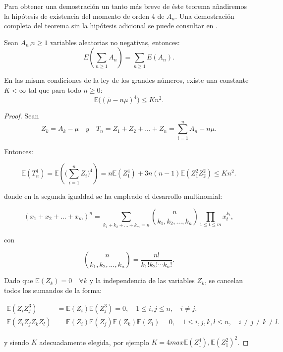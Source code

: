 \documentclass[../proyecto.tex]{memoir}
\begin{document}
Para obtener una demostración un tanto más breve de éste teorema añadiremos la hipótesis de existencia del momento de orden 4 de $A_n$. Una demostración completa del teorema sin la hipótesis adicional se puede consultar en \cite{elLibro}.

\begin{lema}  \label{intercambio_suma}
Sean $A_n$,$ n \geq 1$ variables aleatorias no negativas, entonces: $$
E \left( \sum_{n \geq 1} A_n \right) = \sum_{n \geq 1} E(A_n).
$$

\end{lema}

\begin{lema}
En las misma condiciones de la ley de los grandes números, existe una constante $ K < \infty $ tal que para todo $ n \geq 0$:
$$
\mathds{E} \big( ( \bar{ \mu } - n \mu ) ^ 4 \big) \leq K n^2.
$$
\end{lema}

\begin{proof}

Sean 
$$
Z_k = A_k - \mu \quad y \quad T_n = Z_1 + Z_2 + ... + Z_n = \sum_{i=1}^{n} A_n - n\mu. 
$$

Entonces:

$$
\mathds{E} ( T_{n}^{4} ) = \mathds{E} ( \big( \sum_{i=1}^{n} Z_i \big) ^{4} ) = n\mathds{E}(Z_{1}^4)+3n(n-1)\mathds{E}(Z_1^2 Z_2^2) \leq Kn^2.
$$

donde en la segunda igualdad se ha empleado el desarrollo multinomial:

$$
(x_1+x_2+...+x_m)^n = \sum_{k_1+k_2+...+k_m=n} { n \choose k_1,k_2, ..., k_n} \prod_{1 \leq t \leq m} x_t^{k_t},
$$

con

$$
{ n \choose k_1,k_2, ..., k_n} = \frac{n!}{k_1!k_2! \dotsb k_n!}.
$$

Dado que $\mathds{E}(Z_k)=0 \quad \forall k$ y la independencia de las variables $Z_k$, se cancelan todos los sumandos de la forma:

\begin{align*}
	\mathds{E} (Z_{i} Z_{j}^3 ) &=\mathds{E} (Z_{i}) \mathds{E} (Z_{j}^3) = 0, \quad 1 \leq i,j \leq n, \quad i \neq j, \\
	\mathds{E} ( Z_{i} Z_{j} Z_{k} Z_{l} ) &= \mathds{E} (Z_{i}) \mathds{E} (Z_{j}) \mathds{E} (Z_{k}) \mathds{E} (Z_{l}) = 0, \quad 1 \leq i,j,k,l \leq n, \quad i \neq j \neq k \neq l.
\end{align*}

y siendo $K$ adecuadamente elegida, por ejemplo $K = 4 max{\mathds{E}(Z_1^4), \mathds{E}(Z_1^2)^2}$.
\end{proof}
\end{document}
